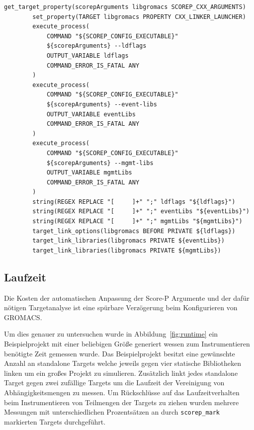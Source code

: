 \documentclass[german,proseminar,hyperref,utf8,lof]{zihpub}
\begin{document}
    \begin{lstlisting}[caption=Workaround für Score-P Bug, gobble=8, label=lst:workaround]
        get_target_property(scorepArguments libgromacs SCOREP_CXX_ARGUMENTS)
        set_property(TARGET libgromacs PROPERTY CXX_LINKER_LAUNCHER)
        execute_process(
            COMMAND "${SCOREP_CONFIG_EXECUTABLE}"
            ${scorepArguments} --ldflags
            OUTPUT_VARIABLE ldflags
            COMMAND_ERROR_IS_FATAL ANY
        )
        execute_process(
            COMMAND "${SCOREP_CONFIG_EXECUTABLE}"
            ${scorepArguments} --event-libs
            OUTPUT_VARIABLE eventLibs
            COMMAND_ERROR_IS_FATAL ANY
        )
        execute_process(
            COMMAND "${SCOREP_CONFIG_EXECUTABLE}"
            ${scorepArguments} --mgmt-libs
            OUTPUT_VARIABLE mgmtLibs
            COMMAND_ERROR_IS_FATAL ANY
        )
        string(REGEX REPLACE "[     ]+" ";" ldflags "${ldflags}")
        string(REGEX REPLACE "[     ]+" ";" eventLibs "${eventLibs}")
        string(REGEX REPLACE "[     ]+" ";" mgmtLibs "${mgmtLibs}")
        target_link_options(libgromacs BEFORE PRIVATE ${ldflags})
        target_link_libraries(libgromacs PRIVATE ${eventLibs})
        target_link_libraries(libgromacs PRIVATE ${mgmtLibs})
    \end{lstlisting}

    \subsection{Laufzeit}
    Die Kosten der automatischen Anpassung der Score-P Argumente und der dafür nötigen Targetanalyse
    ist eine spürbare Verzögerung beim Konfigurieren von GROMACS.

    Um dies genauer zu untersuchen wurde in Abbildung~\ref{fig:runtime} ein Beispielprojekt mit einer
    beliebigen Grö{\ss}e generiert wessen zum Instrumentieren benötigte Zeit gemessen wurde.
    Das Beispielprojekt besitzt eine gewünschte Anzahl an standalone Targets welche jeweils gegen vier
    statische Bibliotheken linken um ein gro{\ss}es Projekt zu simulieren.
    Zusätzlich linkt jedes standalone Target gegen zwei zufällige Targets um die Laufzeit der
    Vereinigung von Abhängigkeitsmengen zu messen.
    Um Rückschlüsse auf das Laufzeitverhalten beim Instrumentieren von Teilmengen der Targets
    zu ziehen wurden mehrere Messungen mit unterschiedlichen Prozentsätzen an durch \texttt{scorep\_mark}
    markierten Targets durchgeführt.
\end{document}
